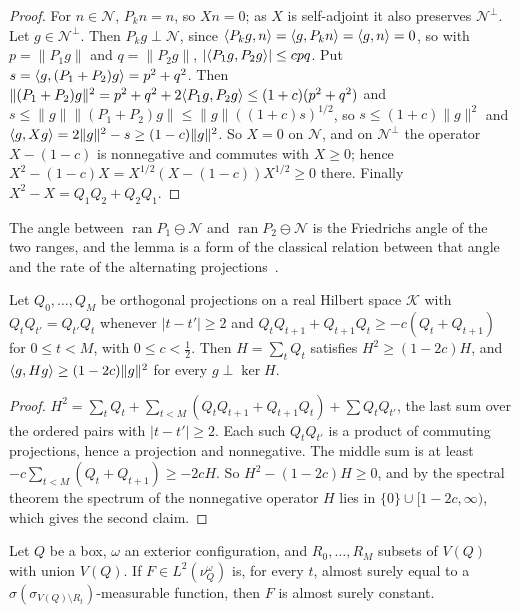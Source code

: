 \begin{proof}
For $n\in\mathcal N$, $P_kn=n$, so $Xn=0$; as $X$ is self-adjoint it also
preserves $\mathcal N^\perp$. Let $g\in\mathcal N^\perp$. Then $P_kg\perp
\mathcal N$, since $\langle P_kg,n\rangle=\langle g,P_kn\rangle=\langle g,n\rangle=0$, so with $p=\|P_1g\|$
and $q=\|P_2g\|$, $|\langle P_1g,P_2g\rangle|\le cpq$. Put $s=\langle g,(P_1+P_2)g\rangle=
p^2+q^2$. Then $\|(P_1+P_2)g\|^2=p^2+q^2+2\langle P_1g,P_2g\rangle\le(1+c)(p^2+q^2)$
and $s\le\|g\|\|(P_1+P_2)g\|\le\|g\|((1+c)s)^{1/2}$, so $s\le(1+c)\|g\|^2$
and $\langle g,Xg\rangle=2\|g\|^2-s\ge(1-c)\|g\|^2$. So $X=0$ on $\mathcal N$, and on
$\mathcal N^\perp$ the operator $X-(1-c)$ is nonnegative and commutes with
$X\ge0$; hence $X^2-(1-c)X=X^{1/2}(X-(1-c))X^{1/2}\ge0$ there. Finally
$X^2-X=Q_1Q_2+Q_2Q_1$.
\end{proof}

The angle between $\operatorname{ran}P_1\ominus\mathcal N$ and
$\operatorname{ran}P_2\ominus\mathcal N$ is the Friedrichs angle of the two
ranges, and the lemma is a form of the classical relation between that angle
and the rate of the alternating projections~\cite{Deu01}.

\begin{lemma}\label{lem:chain}
Let $Q_0,\dots,Q_M$ be orthogonal projections on a real Hilbert space
$\mathcal K$ with $Q_tQ_{t'}=Q_{t'}Q_t$ whenever $|t-t'|\ge2$ and
$Q_tQ_{t+1}+Q_{t+1}Q_t\ge-c(Q_t+Q_{t+1})$ for $0\le t<M$, with $0\le c<
\frac12$. Then $H=\sum_tQ_t$ satisfies $H^2\ge(1-2c)H$, and $\langle g,Hg\rangle\ge
(1-2c)\|g\|^2$ for every $g\perp\ker H$.
\end{lemma}

\begin{proof}
$H^2=\sum_tQ_t+\sum_{t<M}(Q_tQ_{t+1}+Q_{t+1}Q_t)+\sum Q_tQ_{t'}$, the last
sum over the ordered pairs with $|t-t'|\ge2$. Each such $Q_tQ_{t'}$ is a
product of commuting projections, hence a projection and nonnegative. The
middle sum is at least $-c\sum_{t<M}(Q_t+Q_{t+1})\ge-2cH$. So $H^2-(1-2c)H
\ge0$, and by the spectral theorem the spectrum of the nonnegative operator
$H$ lies in $\{0\}\cup[1-2c,\infty)$, which gives the second claim.
\end{proof}

\begin{lemma}\label{lem:constant}
Let $Q$ be a box, $\omega$ an exterior configuration, and $R_0,\dots,R_M$
subsets of $V(Q)$ with union $V(Q)$. If $F\in L^2(\nu^\omega_Q)$ is, for every
$t$, almost surely equal to a $\sigma(\sigma_{V(Q)\setminus
R_t})$-measurable function, then $F$ is almost surely constant.
\end{lemma}

